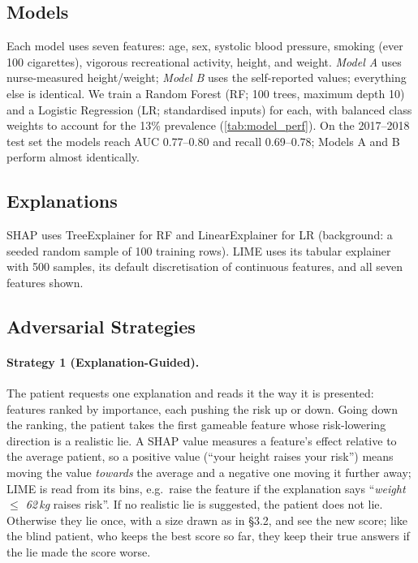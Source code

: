 \documentclass[sigconf,nonacm]{acmart}
\begin{document}
\subsection{Models}

Each model uses seven features: age, sex, systolic blood pressure,
smoking (ever 100 cigarettes), vigorous recreational activity,
height, and weight.  \emph{Model A} uses nurse-measured height/weight;
\emph{Model B} uses the self-reported values; everything else is
identical.  We train a Random Forest (RF; 100 trees, maximum depth 10)
and a Logistic Regression (LR; standardised inputs) for each, with
balanced class weights to account for the 13\% prevalence
(\cref{tab:model_perf}).  On the 2017--2018 test set the models reach
AUC 0.77--0.80 and recall 0.69--0.78; Models A and B perform almost
identically.



\subsection{Explanations}

SHAP uses TreeExplainer for RF and LinearExplainer for LR (background:
a seeded random sample of 100 training rows).  LIME uses its tabular
explainer with 500 samples, its default discretisation of continuous
features, and all seven features shown.

\subsection{Adversarial Strategies}

\paragraph{Strategy 1 (Explanation-Guided).}
The patient requests one explanation and reads it the way it is
presented: features ranked by importance, each pushing the risk up or
down.  Going down the ranking, the patient takes the first gameable
feature whose risk-lowering direction is a realistic lie.  A SHAP
value measures a feature's effect relative to the average patient, so a
positive value (``your height raises your risk'') means moving the
value \emph{towards} the average and a negative one moving it further
away; LIME is read from its bins, e.g.\ raise the feature if the
explanation says ``\emph{weight $\le$ 62\,kg} raises risk''.  If no
realistic lie is suggested, the patient does not lie.  Otherwise they
lie once, with a size drawn as in \S3.2, and see the new score; like
the blind patient, who keeps the best score so far, they keep their
true answers if the lie made the score worse.
\end{document}

